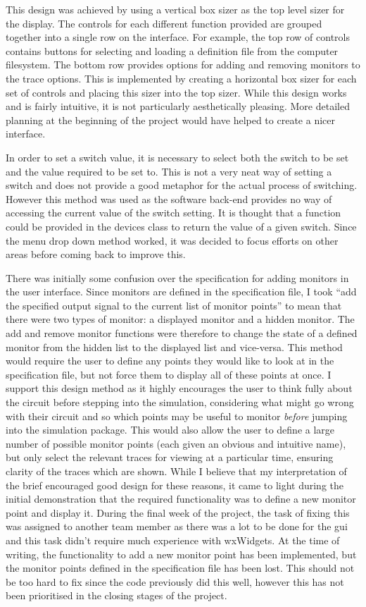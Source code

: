 \documentclass[a4paper,10pt]{article}  %
\begin{document}
This design was achieved by using a vertical box sizer as the top
level sizer for the display. The controls for each different function
provided are grouped together into a single row on the interface. For
example, the top row of controls contains buttons for selecting and
loading a definition file from the computer filesystem. The bottom row
provides options for adding and removing monitors to the trace
options. This is implemented by creating a horizontal box sizer for
each set of controls and placing this sizer into the top sizer. While
this design works and is fairly intuitive, it is not particularly
aesthetically pleasing. More detailed planning at the beginning of the
project would have helped to create a nicer interface.

In order to set a switch value, it is necessary to select both the
switch to be set and the value required to be set to. This is not a
very neat way of setting a switch and does not provide a good metaphor
for the actual process of switching. However this method was used as
the software back-end provides no way of accessing the current value
of the switch setting. It is thought that a function could be provided
in the devices class to return the value of a given switch. Since the
menu drop down method worked, it was decided to focus efforts on other
areas before coming back to improve this.

There was initially some confusion over the specification for adding
monitors in the user interface. Since monitors are defined in the
specification file, I took ``add the specified output signal to the
current list of monitor points'' to mean that there were two types of
monitor: a displayed monitor and a hidden monitor. The add and remove
monitor functions were therefore to change the state of a defined
monitor from the hidden list to the displayed list and
vice-versa. This method would require the user to define any points
they would like to look at in the specification file, but not force
them to display all of these points at once. I support this design
method as it highly encourages the user to think fully about the
circuit before stepping into the simulation, considering what might go
wrong with their circuit and so which points may be useful to monitor
\emph{before} jumping into the simulation package. This would also
allow the user to define a large number of possible monitor points
(each given an obvious and intuitive name), but only select the
relevant traces for viewing at a particular time, ensuring clarity of
the traces which are shown. While I believe that my interpretation of
the brief encouraged good design for these reasons, it came to light
during the initial demonstration that the required functionality was
to define a new monitor point and display it. During the final week of
the project, the task of fixing this was assigned to another team
member as there was a lot to be done for the gui and this task didn't
require much experience with wxWidgets. At the time of writing, the
functionality to add a new monitor point has been implemented, but the
monitor points defined in the specification file has been lost. This
should not be too hard to fix since the code previously did this well,
however this has not been prioritised in the closing stages of the
project.
\end{document}
